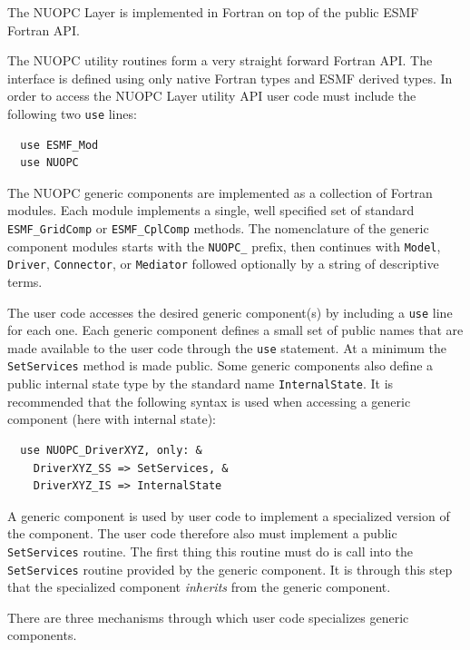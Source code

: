 
The NUOPC Layer is implemented in Fortran on top of the public ESMF Fortran API.

The NUOPC utility routines form a very straight forward Fortran API. The interface is defined using only native Fortran types and ESMF derived types. In order to access the NUOPC Layer utility API user code must include the following two {\tt use} lines:

\begin{verbatim}
  use ESMF_Mod
  use NUOPC
\end{verbatim}

The NUOPC generic components are implemented as a collection of Fortran modules. Each module implements a single, well specified set of standard {\tt ESMF\_GridComp} or {\tt ESMF\_CplComp} methods. The nomenclature of the generic component modules starts with the {\tt NUOPC\_} prefix, then continues with {\tt Model}, {\tt Driver}, {\tt Connector}, or {\tt Mediator} followed optionally by a string of descriptive terms.

The user code accesses the desired generic component(s) by including a {\tt use} line for each one. Each generic component defines a small set of public names that are made available to the user code through the {\tt use} statement. At a minimum the {\tt SetServices} method is made public. Some generic components also define a public internal state type by the standard name {\tt InternalState}. It is recommended that the following syntax is used when accessing a generic component (here with internal state):

\begin{verbatim}
  use NUOPC_DriverXYZ, only: &
    DriverXYZ_SS => SetServices, &
    DriverXYZ_IS => InternalState
\end{verbatim}

A generic component is used by user code to implement a specialized version of the component. The user code therefore also must implement a public {\tt SetServices} routine. The first thing this routine must do is call into the {\tt SetServices} routine provided by the generic component. It is through this step that the specialized component {\em inherits} from the generic component.

There are three mechanisms through which user code specializes generic components.

